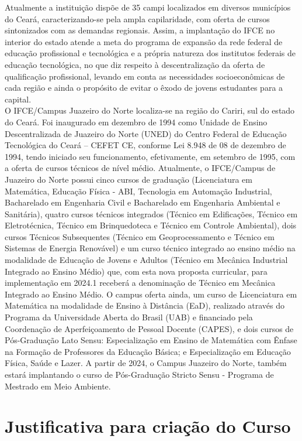Atualmente a instituição dispõe de 35 campi localizados em diversos municípios do Ceará, caracterizando-se pela ampla capilaridade, com oferta de cursos sintonizados com as demandas regionais. Assim, a implantação do IFCE no interior do estado atende a meta do programa de expansão da rede federal de educação profissional e tecnológica e a própria natureza dos institutos federais de educação tecnológica, no que diz respeito à descentralização da oferta de qualificação profissional, levando em conta as necessidades socioeconômicas de cada região e ainda o propósito de evitar o êxodo de jovens estudantes para a capital.\\

O IFCE/Campus Juazeiro do Norte localiza-se na região do Cariri, sul do estado do Ceará. Foi inaugurado em dezembro de 1994 como Unidade de Ensino Descentralizada de Juazeiro do Norte (UNED) do Centro Federal de Educação Tecnológica do Ceará – CEFET CE, conforme Lei 8.948 de 08 de dezembro de 1994, tendo iniciado seu funcionamento, efetivamente, em setembro de 1995, com a oferta de cursos técnicos de nível médio. Atualmente, o IFCE/Campus de Juazeiro do Norte possui cinco cursos de graduação (Licenciatura em Matemática, Educação Física - ABI, Tecnologia em Automação Industrial, Bacharelado em Engenharia Civil e Bacharelado em Engenharia Ambiental e Sanitária), quatro cursos técnicos integrados (Técnico em Edificações, Técnico em Eletrotécnica, Técnico em Brinquedoteca e Técnico em Controle Ambiental), dois cursos Técnicos Subsequentes (Técnico em Geoprocessamento e Técnico em Sistemas de Energia Renovável) e um curso técnico integrado ao ensino médio na modalidade de Educação de Jovens e Adultos (Técnico em Mecânica Industrial Integrado ao Ensino Médio) que, com esta nova proposta curricular, para implementação em 2024.1 receberá a denominação de Técnico em Mecânica Integrado ao Ensino Médio. O campus oferta ainda, um curso de Licenciatura em Matemática na modalidade de Ensino à Distância (EaD), realizado através do Programa da Universidade Aberta do Brasil (UAB) e financiado pela Coordenação de Aperfeiçoamento de Pessoal Docente (CAPES), e dois cursos de Pós-Graduação Lato Sensu: Especialização em Ensino de Matemática com Ênfase na Formação de Professores da Educação Básica; e Especialização em Educação Física, Saúde e Lazer. A partir de 2024, o Campus Juazeiro do Norte, também estará implantando o curso de Pós-Graduação Stricto Sensu - Programa de Mestrado em Meio Ambiente.

\chapter{Justificativa para criação do Curso}

